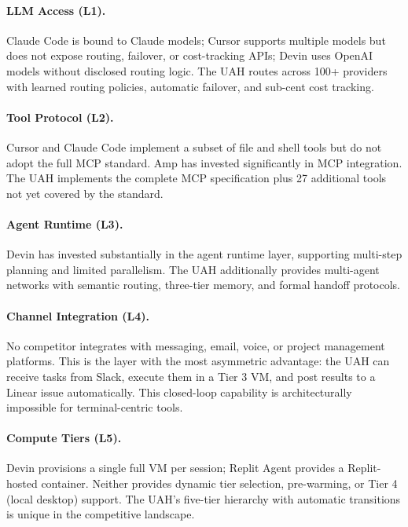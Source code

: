 \paragraph{LLM Access (L1).}
Claude Code is bound to Claude models; Cursor supports multiple models but
does not expose routing, failover, or cost-tracking APIs; Devin uses OpenAI
models without disclosed routing logic. The UAH routes across 100+ providers
with learned routing policies, automatic failover, and sub-cent cost tracking.

\paragraph{Tool Protocol (L2).}
Cursor and Claude Code implement a subset of file and shell tools but do not
adopt the full MCP standard. Amp has invested significantly in MCP integration.
The UAH implements the complete MCP specification plus 27 additional tools
not yet covered by the standard.

\paragraph{Agent Runtime (L3).}
Devin has invested substantially in the agent runtime layer, supporting
multi-step planning and limited parallelism. The UAH additionally provides
multi-agent networks with semantic routing, three-tier memory, and formal
handoff protocols.

\paragraph{Channel Integration (L4).}
No competitor integrates with messaging, email, voice, or project management
platforms. This is the layer with the most asymmetric advantage: the UAH can
receive tasks from Slack, execute them in a Tier 3 VM, and post results to a
Linear issue automatically. This closed-loop capability is architecturally
impossible for terminal-centric tools.

\paragraph{Compute Tiers (L5).}
Devin provisions a single full VM per session; Replit Agent provides a
Replit-hosted container. Neither provides dynamic tier selection, pre-warming,
or Tier 4 (local desktop) support. The UAH's five-tier hierarchy with
automatic transitions is unique in the competitive landscape.

